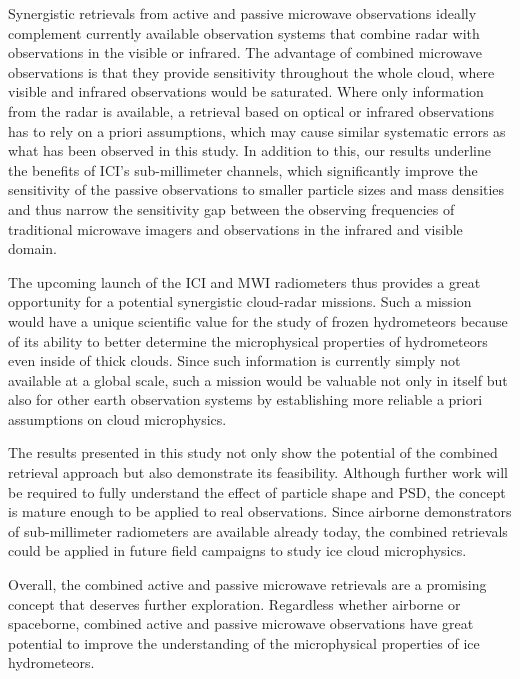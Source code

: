 \documentclass[journal abbreviation, manuscript]{copernicus}
\begin{document}
Synergistic retrievals from active and passive microwave observations ideally
complement currently available observation systems that combine radar with
observations in the visible or infrared. The advantage of combined microwave
observations is that they provide sensitivity throughout the whole cloud, where
visible and infrared observations would be saturated. Where only information
from the radar is available, a retrieval based on optical or infrared
observations has to rely on a priori assumptions, which may cause similar
systematic errors as what has been observed in this study. In addition to this,
our results underline the benefits of ICI's sub-millimeter channels, which
significantly improve the sensitivity of the passive observations to smaller
particle sizes and mass densities and thus narrow the sensitivity gap between
the observing frequencies of traditional microwave imagers and observations in
the infrared and visible domain.

The upcoming launch of the ICI and MWI radiometers thus provides a great
opportunity for a potential synergistic cloud-radar missions. Such a mission
would have a unique scientific value for the study of frozen hydrometeors
because of its ability to better determine the microphysical properties of
hydrometeors even inside of thick clouds. Since such information is currently
simply not available at a global scale, such a mission would be valuable not
only in itself but also for other earth observation systems by establishing more
reliable a priori assumptions on cloud microphysics.

The results presented in this study not only show the potential of the combined
retrieval approach but also demonstrate its feasibility. Although further work
will be required to fully understand the effect of particle shape and PSD, the
concept is mature enough to be applied to real observations. Since airborne
demonstrators of sub-millimeter radiometers are available already today, the
combined retrievals could be applied in future field campaigns to study ice
cloud microphysics.

Overall, the combined active and passive microwave retrievals are a promising
concept that deserves further exploration. Regardless whether airborne or
spaceborne, combined active and passive microwave observations have great
potential to improve the understanding of the microphysical properties of ice
hydrometeors.

\end{document}
